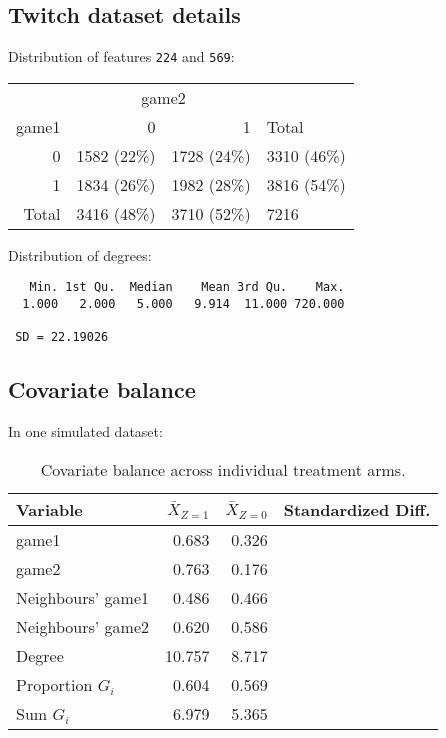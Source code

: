 \documentclass[10pt]{article}
\begin{document}
\subsection{Twitch dataset details} \label{apx:twitch}
\todo

Distribution of features \verb|224| and \verb|569|:

\begin{table}[H]
\centering
\begin{tabular}{@{}rrrl@{}}
\toprule
& \multicolumn{2}{c}{game2} \\
\cmidrule(lr){2-3}
game1 & 0 & 1 & Total \\
\midrule
0 & 1582 (22\%) & 1728 (24\%) & 3310 (46\%) \\
1 & 1834 (26\%) & 1982 (28\%) & 3816 (54\%) \\
Total & 3416 (48\%) & 3710 (52\%) & 7216 \\
\bottomrule
\end{tabular}
\end{table}

Distribution of degrees:
\begin{verbatim}
   Min. 1st Qu.  Median    Mean 3rd Qu.    Max. 
  1.000   2.000   5.000   9.914  11.000 720.000
  
 SD = 22.19026
\end{verbatim}

\subsection{Covariate balance} \label{apx:covbal}

In one simulated dataset:

\begin{table}[H]
\centering
\begin{tabular}{@{}lrrr@{}}
\toprule
Variable & $\bar{X}_{Z=1}$ & $\bar{X}_{Z=0}$ & Standardized Diff. \\
\midrule
game1 & 0.683 & 0.326 &  \\
game2 & 0.763 & 0.176 &  \\
Neighbours' game1 & 0.486 & 0.466 & \\
Neighbours' game2 & 0.620 & 0.586 & \\
Degree & 10.757 & 8.717 & \\
Proportion $G_i$ & 0.604 & 0.569 & \\
Sum $G_i$ & 6.979 & 5.365 & \\
\bottomrule
\end{tabular}
\caption{Covariate balance across individual treatment arms.}
\end{table}
\end{document}
